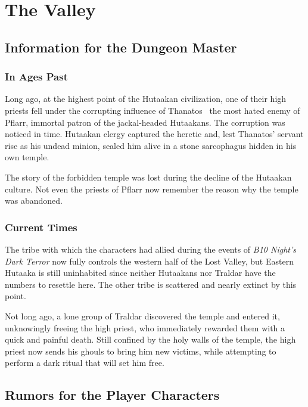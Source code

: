 \documentclass[english,11pt,openany,letterpaper,twocolumn]{book}
\begin{document}
\chapter{The Valley}
\label{ch:valley}

\section{Information for the Dungeon Master}

\subsection{In Ages Past}

Long ago, at the highest point of the Hutaakan civilization, one of their high priests fell under the corrupting influence of Thanatos \dash\ the most hated enemy of Pflarr, immortal patron of the jackal-headed Hutaakans. The corruption was noticed in time. Hutaakan clergy captured the heretic and, lest Thanatos' servant rise as his undead minion, sealed him alive in a stone sarcophagus hidden in his own temple.

\tab The story of the forbidden temple was lost during the decline of the Hutaakan culture. Not even the priests of Pflarr now remember the reason why the temple was abandoned.

\subsection{Current Times}

\tab The tribe with which the characters had allied during the events of \emph{B10 Night's Dark Terror} now fully controls the western half of the Lost Valley, but Eastern Hutaaka is still uninhabited since neither Hutaakans nor Traldar have the numbers to resettle here. The other tribe is scattered and nearly extinct by this point.

\tab Not long ago, a lone group of Traldar discovered the temple and entered it, unknowingly freeing the high priest, who immediately rewarded them with a quick and painful death. Still confined by the holy walls of the temple, the high priest now sends his ghouls to bring him new victims, while attempting to perform a dark ritual that will set him free.

\break

\section{Rumors for the Player Characters}
\end{document}
